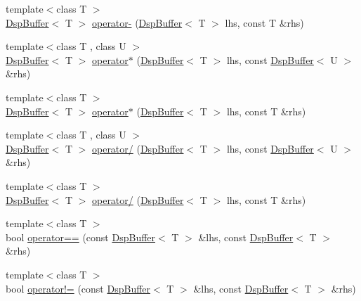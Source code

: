 \begin{DoxyCompactItemize}
\item 
{\footnotesize template$<$class T $>$ }\\\hyperlink{class_smart_dsp_1_1_dsp_buffer}{Dsp\+Buffer}$<$ T $>$ \hyperlink{namespace_smart_dsp_a9196814b51945ddda5c6e9508c769b90}{operator-\/} (\hyperlink{class_smart_dsp_1_1_dsp_buffer}{Dsp\+Buffer}$<$ T $>$ lhs, const T \&rhs)
\item 
{\footnotesize template$<$class T , class U $>$ }\\\hyperlink{class_smart_dsp_1_1_dsp_buffer}{Dsp\+Buffer}$<$ T $>$ \hyperlink{namespace_smart_dsp_a542a95710b90e65cfd4a4edf7be4e3ce}{operator$\ast$} (\hyperlink{class_smart_dsp_1_1_dsp_buffer}{Dsp\+Buffer}$<$ T $>$ lhs, const \hyperlink{class_smart_dsp_1_1_dsp_buffer}{Dsp\+Buffer}$<$ U $>$ \&rhs)
\item 
{\footnotesize template$<$class T $>$ }\\\hyperlink{class_smart_dsp_1_1_dsp_buffer}{Dsp\+Buffer}$<$ T $>$ \hyperlink{namespace_smart_dsp_a6c7c544c9be4a9e8a598eb446441da48}{operator$\ast$} (\hyperlink{class_smart_dsp_1_1_dsp_buffer}{Dsp\+Buffer}$<$ T $>$ lhs, const T \&rhs)
\item 
{\footnotesize template$<$class T , class U $>$ }\\\hyperlink{class_smart_dsp_1_1_dsp_buffer}{Dsp\+Buffer}$<$ T $>$ \hyperlink{namespace_smart_dsp_a954ae7b28b781abf51439362f1bae1b3}{operator/} (\hyperlink{class_smart_dsp_1_1_dsp_buffer}{Dsp\+Buffer}$<$ T $>$ lhs, const \hyperlink{class_smart_dsp_1_1_dsp_buffer}{Dsp\+Buffer}$<$ U $>$ \&rhs)
\item 
{\footnotesize template$<$class T $>$ }\\\hyperlink{class_smart_dsp_1_1_dsp_buffer}{Dsp\+Buffer}$<$ T $>$ \hyperlink{namespace_smart_dsp_a76ac2e5c93d53399c086dae052291c0d}{operator/} (\hyperlink{class_smart_dsp_1_1_dsp_buffer}{Dsp\+Buffer}$<$ T $>$ lhs, const T \&rhs)
\item 
{\footnotesize template$<$class T $>$ }\\bool \hyperlink{namespace_smart_dsp_a3636f3a26e39c895ad84dcdef6f5307e}{operator==} (const \hyperlink{class_smart_dsp_1_1_dsp_buffer}{Dsp\+Buffer}$<$ T $>$ \&lhs, const \hyperlink{class_smart_dsp_1_1_dsp_buffer}{Dsp\+Buffer}$<$ T $>$ \&rhs)
\item 
{\footnotesize template$<$class T $>$ }\\bool \hyperlink{namespace_smart_dsp_a8d6e4c7bb68c21a9d2c8a89e9072751e}{operator!=} (const \hyperlink{class_smart_dsp_1_1_dsp_buffer}{Dsp\+Buffer}$<$ T $>$ \&lhs, const \hyperlink{class_smart_dsp_1_1_dsp_buffer}{Dsp\+Buffer}$<$ T $>$ \&rhs)

\end{DoxyCompactItemize}
